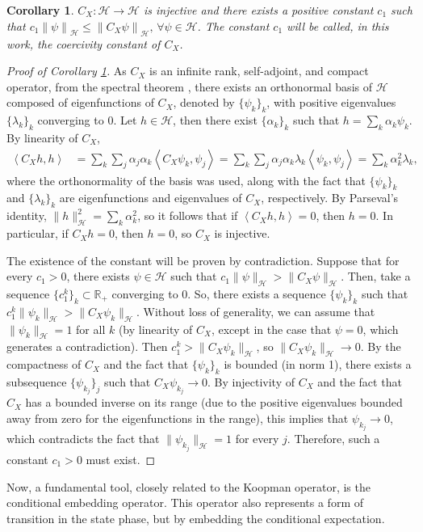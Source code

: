 \documentclass{article}
\newcommand{\R}{\mathbb{R}} %
\newcommand{\norm}[1]{\left\lVert#1\right\rVert} %
\newcommand{\inner}[2]{\left\langle#1, #2\right\rangle} %
\newtheorem{cor}{Corollary}
\renewcommand{\H}{\mathcal{H}}
\begin{document}
\begin{cor}
    \label{cor:cx_inj}
    $C_X:\H \to \H$ is injective and there exists a positive constant $c_1$ such that \(c_1 \norm{\psi}_\H \leq \norm{C_X \psi}_\H, \, \forall \psi \in \H\).
    The constant $c_1$ will be called, in this work, the coercivity constant of $C_X$.
\end{cor}

\begin{proof}[Proof of Corollary \ref{cor:cx_inj}]
As $C_X$ is an infinite rank, self-adjoint, and compact operator, from the spectral theorem \cite{Brezis2011FunctionalEquations}, there exists an orthonormal basis of $\H$ composed of eigenfunctions of $C_X$, denoted by $\{\psi_k\}_k$, with positive eigenvalues $\{\lambda_k\}_k$ converging to $0$. Let $h \in \H$, then there exist $\{\alpha_k\}_k$ such that \(h = \sum_k \alpha_k \psi_k\). By linearity of $C_X$,
\[
\begin{aligned}
    \inner{C_Xh}{h} &= \sum_k \sum_j \alpha_j \alpha_k \inner{C_X \psi_k}{\psi_j} = \sum_k \sum_j \alpha_j \alpha_k \lambda_k \inner{\psi_k}{\psi_j} = \sum_k \alpha_k^2 \lambda_k,
\end{aligned}
\]
where the orthonormality of the basis was used, along with the fact that $\{\psi_k\}_k$ and $\{\lambda_k\}_k$ are eigenfunctions and eigenvalues of $C_X$, respectively. By Parseval's identity, \(\|h\|_\H^2 = \sum_k \alpha_k^2\), so it follows that if $\inner{C_Xh}{h} = 0$, then $h = 0$. In particular, if $C_X h = 0$, then $h=0$, so $C_X$ is injective.

The existence of the constant will be proven by contradiction. Suppose that for every $c_1 > 0$, there exists $\psi \in \H$ such that \(c_1 \| \psi \|_\H > \| C_X \psi\|_\H.\) Then, take a sequence $\{c_1^k\}_k \subset \R_+$ converging to $0$. So, there exists a sequence $\{\psi_k\}_k$ such that \(c_1^k \| \psi_k\|_\H > \| C_X \psi_k\|_\H.\) Without loss of generality, we can assume that $\| \psi_k \|_\H = 1$ for all $k$ (by linearity of $C_X$, except in the case that $\psi = 0$, which generates a contradiction). Then \(c_1^k > \| C_X \psi_k\|_\H\), so $\|C_X \psi_k\|_\H \to 0$. By the compactness of $C_X$ and the fact that $\{\psi_k\}_k$ is bounded (in norm 1), there exists a subsequence $\{\psi_{k_j}\}_j$ such that $C_X \psi_{k_j} \to 0$. By injectivity of $C_X$ and the fact that $C_X$ has a bounded inverse on its range (due to the positive eigenvalues bounded away from zero for the eigenfunctions in the range), this implies that $\psi_{k_j} \to 0$, which contradicts the fact that $\|\psi_{k_j}\|_\H = 1$ for every $j$. Therefore, such a constant $c_1 > 0$ must exist.
\end{proof}
Now, a fundamental tool, closely related to the Koopman operator, is the conditional embedding operator. This operator also represents a form of transition in the state phase, but by embedding the conditional expectation.
\end{document}

